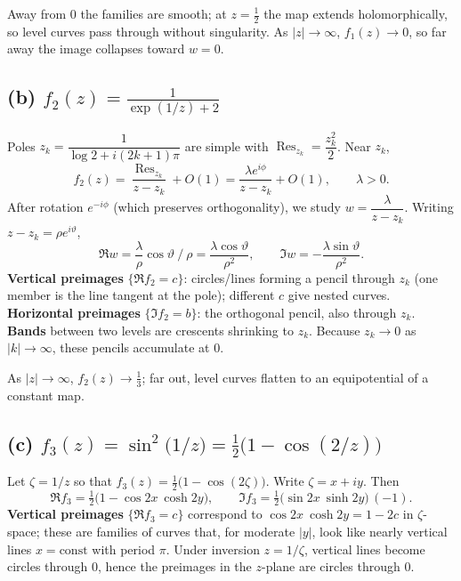 \documentclass[12pt,a4paper]{article}
\begin{document}
	\medskip
	Away from \(0\) the families are smooth; at \(z=\tfrac12\) the map extends holomorphically, so level curves pass through without singularity.
	As \(|z|\to\infty\), \(f_1(z)\to 0\), so far away the image collapses toward \(w=0\).
	
	\bigskip
	
	\subsection*{(b) \(\displaystyle f_2(z)=\frac{1}{\exp(1/z)+2}\)}
	Poles \(z_k=\dfrac{1}{\log 2+i(2k+1)\pi}\) are simple with \(\operatorname{Res}_{z_k}=\dfrac{z_k^{2}}{2}\).
	Near \(z_k\),
	\[
	f_2(z)=\frac{\operatorname{Res}_{z_k}}{z-z_k}+O(1)
	=\frac{\lambda e^{i\phi}}{z-z_k}+O(1),
	\qquad \lambda>0.
	\]
	After rotation \(e^{-i\phi}\) (which preserves orthogonality), we study \(w=\dfrac{\lambda}{z-z_k}\).
	Writing \(z-z_k=\rho e^{i\vartheta}\),
	\[
	\Re w=\frac{\lambda}{\rho}\cos\vartheta\ \Big/\ \rho=\frac{\lambda\cos\vartheta}{\rho^{2}},
	\qquad
	\Im w=-\frac{\lambda\sin\vartheta}{\rho^{2}}.
	\]
	\textbf{Vertical preimages} \(\{\Re f_2=c\}\): circles/lines forming a pencil through \(z_k\) (one member is the line tangent at the pole); different \(c\) give nested curves.
	\quad
	\textbf{Horizontal preimages} \(\{\Im f_2=b\}\): the orthogonal pencil, also through \(z_k\).
	\quad
	\textbf{Bands} between two levels are crescents shrinking to \(z_k\).
	Because \(z_k\to 0\) as \(|k|\to\infty\), these pencils accumulate at \(0\).
	
	\medskip
	As \(|z|\to\infty\), \(f_2(z)\to \tfrac13\); far out, level curves flatten to an equipotential of a constant map.
	
	\bigskip
	
	\subsection*{(c) \(\displaystyle f_3(z)=\sin^{2}\!\bigl(1/z\bigr)=\tfrac12\bigl(1-\cos(2/z)\bigr)\)}
	Let \(\zeta=1/z\) so that \(f_3(z)=\tfrac12\bigl(1-\cos(2\zeta)\bigr)\).
	Write \(\zeta=x+iy\).
	Then
	\[
	\Re f_3=\tfrac12\bigl(1-\cos 2x\ \cosh 2y\bigr),
	\qquad
	\Im f_3=\tfrac12\bigl(\sin 2x\ \sinh 2y\bigr)\,(-1).
	\]
	\textbf{Vertical preimages} \(\{\Re f_3=c\}\) correspond to \(\cos 2x\ \cosh 2y=1-2c\) in \(\zeta\)-space; these are families of curves that, for moderate \(|y|\), look like nearly vertical lines \(x=\text{const}\) with period \(\pi\).
	Under inversion \(z=1/\zeta\), vertical lines become circles through \(0\), hence the preimages in the \(z\)-plane are circles through \(0\).
	
\end{document}
